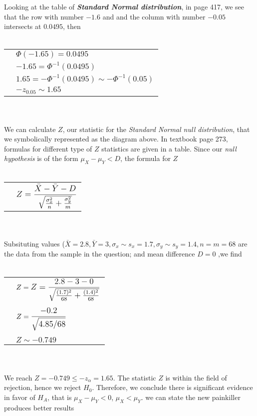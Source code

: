\documentclass[12pt]{article}
\begin{document}
Looking at the table of
\textit{\textbf{Standard Normal distribution}}, in page 417, we see 
that the row with number $-1.6$ and and the column with 
number $-0.05$ intersects at $0.0495$, 
then
\\ \\
\begin{tabular}{l l}
    & $\Phi(-1.65)=0.0495$\\
    & $-1.65=\Phi^{-1}(0.0495)$\\
    & $1.65=-\Phi^{-1}(0.0495) \sim -\Phi^{-1}(0.05)$\\
    & $-z_{0.05} \sim 1.65$\\
\end{tabular}
\\ \\
We can calculate $Z$, our statistic for the 
\textit{Standard Normal null distribution}, that
we symbolically represented as the diagram above.
In textbook page 273, formulas for different
type of $Z$ statistics are given in a table.
Since our \textit{null hypothesis} is of the form
$\mu_X-\mu_Y < D$, the formula for $Z$
\\ \\
\begin{tabular}{l l}
    &$\bilargeMathText{Z=\frac{\bar{X}-\bar{Y}-D}{\sqrt{ \frac{\sigma_x^2}{n}+\frac{\sigma_y^2}{m}}}}$\\
\end{tabular}
\\ \\
Subsituting values
($\bar{X}=2.8, \bar{Y}=3, \sigma_x \sim s_x=1.7,\sigma_y \sim s_y=1.4, n=m=68$ are the data from 
the sample in the question; and mean difference $D=0$ ,we find
\\ \\
\begin{tabular}{l l}
    &$Z=\bilargeMathText{Z=\frac{2.8-3-0}{\sqrt{ \frac{(1.7)^2}{68}+\frac{(1.4)^2}{68}}}}$\\
    &\\
    &$Z=\bilargeMathText{\frac{-0.2}{\sqrt{4.85/68}}}$\\
    &\\
    &$Z \sim -0.749$\\
\end{tabular}
\\ \\
We reach $Z=-0.749 \leq -z_\alpha=1.65$.
The statistic $Z$ is within the field of rejection, 
hence we reject $H_0$.
Therefore, we conclude there is significant evidence
in favor of $H_A$, that is $\mu_X-\mu_Y < 0$, 
$\mu_X<\mu_Y$.
we can state the new painkiller produces better results
\end{document}
